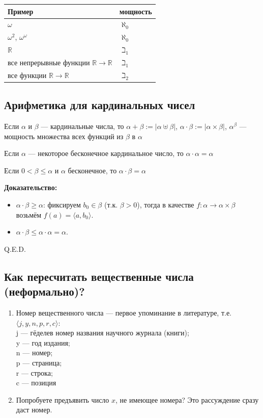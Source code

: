 \begin{center}
\begin{tabular}{l|l}
Пример & мощность\\\hline
$\omega$ & $\aleph_0$\\
$\omega^2$, $\omega^\omega$ & $\aleph_0$\\
$\mathbb{R}$ & $\beth_1$\\
все непрерывные функции $\mathbb{R}\rightarrow\mathbb{R}$ & $\beth_1$\\
все функции $\mathbb{R}\rightarrow\mathbb{R}$ & $\beth_2$
\end{tabular}
\end{center}

\subsection{Арифметика для кардинальных чисел}

 Если $\alpha$ и $\beta$ --- кардинальные числа, то 
$\alpha + \beta := |\alpha\uplus\beta|$,
$\alpha \cdot \beta := |\alpha \times \beta|$, 
$\alpha ^\beta$ --- мощность множества всех функций из $\beta$ в $\alpha$

 Если $\alpha$ --- некоторое бесконечное кардинальное число, то $\alpha\cdot\alpha = \alpha$

 Если $0 < \beta \le \alpha$ и $\alpha$ бесконечное, то $\alpha\cdot\beta = \alpha$

\textbf{Доказательство:}
\begin{itemize}
\item $\alpha \cdot \beta \ge \alpha$: фиксируем $b_0 \in \beta$ (т.к. $\beta > 0$), тогда в качестве $f : \alpha \rightarrow \alpha \times \beta$ возьмём $f(a) = \langle a,b_0\rangle$.
\item $\alpha \cdot \beta \le \alpha \cdot \alpha = \alpha$.
\end{itemize}
\hfill Q.E.D.

\subsection{Как пересчитать вещественные числа (неформально)?}

\begin{enumerate}
\item Номер вещественного числа --- первое упоминание в литературе, т.е. $\langle j, y, n, p, r, c \rangle$:\\
j --- гёделев номер названия научного журнала (книги);\\
y --- год издания;\\
n --- номер;\\
p --- страница;\\
r --- строка;\\
c --- позиция
\item Попробуете предъявить число $x$, не имеющее номера? Это рассуждение сразу даст номер.\\
\end{enumerate}

